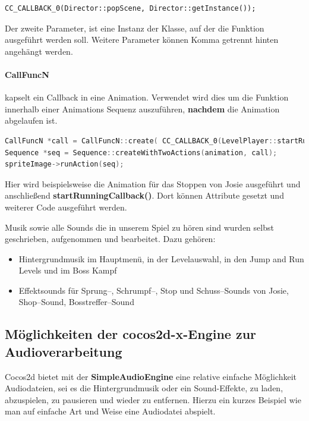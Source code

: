 \begin{lstlisting}[style=singleline]
CC_CALLBACK_0(Director::popScene, Director::getInstance());
\end{lstlisting}

Der zweite Parameter, ist eine Instanz der Klasse, auf der die Funktion ausgeführt werden soll. Weitere Parameter können Komma getrennt hinten angehängt werden.

\paragraph{CallFuncN} kapselt ein Callback in eine Animation. Verwendet wird dies um die Funktion innerhalb einer Animations Sequenz auszuführen, \textbf{nachdem} die Animation abgelaufen ist.

\begin{lstlisting}[label=lst:CallFuncN,
				   language=C++,
				   firstnumber=112,
				   caption=BossPlayer als Observer eintragen ( LevelPlayer.cpp )]
CallFuncN *call = CallFuncN::create( CC_CALLBACK_0(LevelPlayer::startRunningCallback, this));
Sequence *seq = Sequence::createWithTwoActions(animation, call);
spriteImage->runAction(seq);
\end{lstlisting}

Hier wird beispielsweise die Animation für das Stoppen von Josie ausgeführt und anschließend \textbf{startRunningCallback()}. Dort können Attribute gesetzt und weiterer Code ausgeführt werden.



\label{sec:2_Tilemaps}



\label{sec:2_Musik}
Musik sowie alle Sounds die in unserem Spiel \gamename zu hören sind wurden selbst geschrieben, aufgenommen und bearbeitet. Dazu gehören:

\begin{itemize}
\item Hintergrundmusik im Hauptmenü, in der Levelauswahl, in den Jump and Run Levels und im Boss Kampf
\item Effektsounds für Sprung--, Schrumpf--, Stop und Schuss--Sounds von Josie, Shop--Sound, Bosstreffer--Sound
\end{itemize}


\subsection{Möglichkeiten der cocos2d-x-Engine zur Audioverarbeitung}
Cocos2d bietet mit der \textbf{SimpleAudioEngine} eine relative einfache Möglichkeit Audio\-dateien, sei es die Hintergrundmusik oder ein Sound-Effekte, zu laden, abzuspielen, zu pausieren und wieder zu entfernen. Hierzu ein kurzes Beispiel wie man auf einfache Art und Weise eine Audiodatei abspielt.

